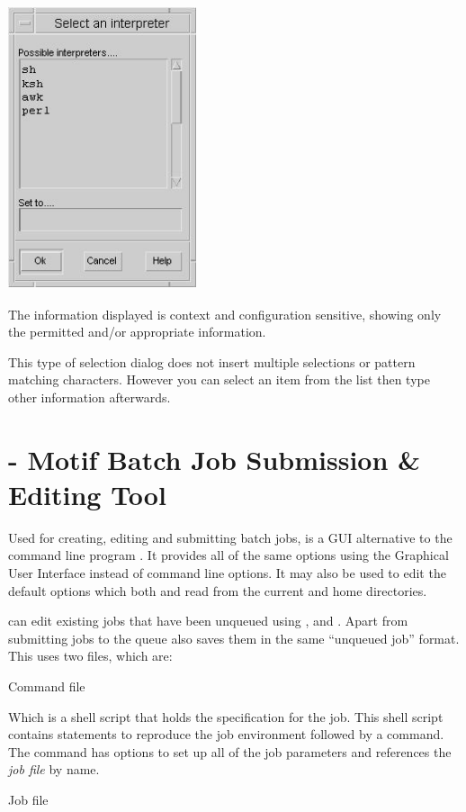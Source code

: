  \includegraphics[width=5.525cm,height=8.333cm]{img/ref37.jpg} 

The information displayed is context and configuration sensitive, showing only the permitted and/or appropriate information.

This type of selection dialog does not insert multiple selections or pattern matching characters. However you can select an item from the
list then type other information afterwards.

\section{\XmbtrName{} - Motif Batch Job Submission \& Editing Tool}
Used for creating, editing and submitting batch jobs, \PrXmbtr{} is a GUI alternative to the command line program \BtrName. It provides all of the same options using the Graphical User Interface instead of command line options. It may also be used to edit the default options which both \PrXmbtr{} and
\PrBtr{} read from the current and home directories.

\PrXmbtr{} can edit existing jobs that have been unqueued using \PrBtq{}, \PrXmbtq{} and \PrBtjdel{}. Apart from submitting jobs to the
queue \PrXmbtr{} also saves them in the same ``unqueued job'' format. This uses two files, which are:

Command file

Which is a shell script that holds the specification for the job. This shell script contains statements to reproduce the job environment
followed by a \PrBtr{} command. The \PrBtr{} command has options to set up all of the job
parameters and references the \textit{job file} by name.

Job file

